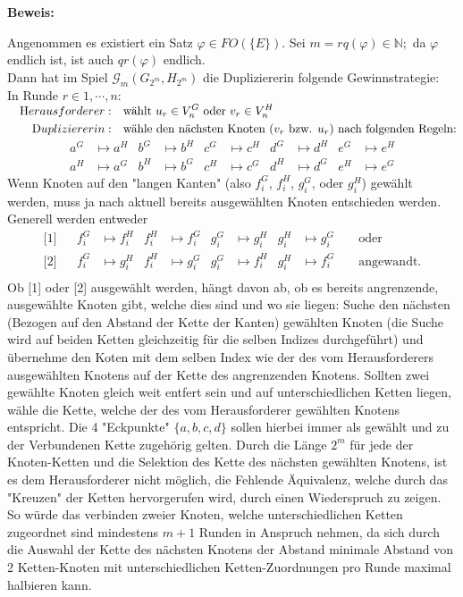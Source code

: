 \documentclass[11pt, a4paper]{article}
\begin{document}
\textbf{Beweis:}

Angenommen es existiert ein Satz $\varphi \in FO(\{E\})$.
Sei $m = rq(\varphi) \in \mathbb{N};$ da $\varphi$ endlich ist, ist auch $qr(\varphi)$ endlich. \\
Dann hat im Spiel $\mathcal{G}_m(G_{2^m}, H_{2^m})$ die Dupliziererin folgende Gewinnstrategie:\\

In Runde $r \in {1, \cdots, n}$:\\
$\null\quad\begin{aligned}
    \text Herausforderer: &\quad \text{wählt } u_r \in V^G_n \text{ oder } v_r \in V^H_n \\
    \text Dupliziererin: &\quad \text{wähle den nächsten Knoten ($v_r$ bzw. $u_r$) nach folgenden Regeln:}
\end{aligned}$
\begin{align*}
    a^G &\mapsto a^H & b^G &\mapsto b^H & c^G &\mapsto c^H & d^G &\mapsto d^H & e^G &\mapsto e^H \\ 
    a^H &\mapsto a^G & b^H &\mapsto b^G & c^H &\mapsto c^G & d^H &\mapsto d^G & e^H &\mapsto e^G
\end{align*}
Wenn Knoten auf den "langen Kanten" (also $f^G_i$, $f^H_i$, $g^G_i$, oder $g^H_i$) gewählt werden, muss ja nach aktuell bereits ausgewählten Knoten entschieden werden.
Generell werden entweder
\begin{align*}
    \text{[1]} && f_i^G &\mapsto f_i^H  &  f^H_i &\mapsto f^G_i  &  g_i^G &\mapsto g_i^H  &  g^H_i &\mapsto g^G_i && \text{ oder} \\
    \text{[2]} && f_i^G &\mapsto g_i^H  &  f^H_i &\mapsto g^G_i  &  g_i^G &\mapsto f_i^H  &  g^H_i &\mapsto f^G_i && \text{ angewandt.} \\
\end{align*}
Ob [1] oder [2] ausgewählt werden, hängt davon ab, ob es bereits angrenzende, ausgewählte Knoten gibt, welche dies sind und wo sie liegen:
Suche den nächsten (Bezogen auf den Abstand der Kette der Kanten) gewählten Knoten (die Suche wird auf beiden Ketten gleichzeitig für die selben Indizes durchgeführt) und übernehme den Koten mit dem selben Index wie der des vom Herausforderers ausgewählten Knotens auf der Kette des angrenzenden Knotens.
Sollten zwei gewählte Knoten gleich weit entfert sein und auf unterschiedlichen Ketten liegen, wähle die Kette, welche der des vom Herausforderer gewählten Knotens entspricht.
Die 4 "Eckpunkte" $\{a,b,c,d\}$ sollen hierbei immer als gewählt und zu der Verbundenen Kette zugehörig gelten.
Durch die Länge $2^m$ für jede der Knoten-Ketten und die Selektion des Kette des nächsten gewählten Knotens, ist es dem Herausforderer nicht möglich, die Fehlende Äquivalenz, welche durch das "Kreuzen" der Ketten hervorgerufen wird, durch einen Wiederspruch zu zeigen.
So würde das verbinden zweier Knoten, welche unterschiedlichen Ketten zugeordnet sind mindestens $m+1$ Runden in Anspruch nehmen, da sich durch die Auswahl der Kette des nächsten Knotens der Abstand minimale Abstand von 2 Ketten-Knoten mit unterschiedlichen Ketten-Zuordnungen pro Runde maximal halbieren kann.
\\
\end{document}
